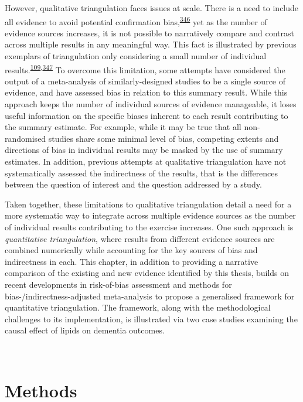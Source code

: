 \documentclass[a4paper, twoside]{templates/ociamthesis}
\begin{document}
However, qualitative triangulation faces issues at scale. There is a need to include all evidence to avoid potential confirmation bias,\textsuperscript{\protect\hyperlink{ref-dubroff2018}{346}} yet as the number of evidence sources increases, it is not possible to narratively compare and contrast across multiple results in any meaningful way. This fact is illustrated by previous exemplars of triangulation only considering a small number of individual results.\textsuperscript{\protect\hyperlink{ref-lawlor2016}{109},\protect\hyperlink{ref-ference2014}{347}} To overcome this limitation, some attempts have considered the output of a meta-analysis of similarly-designed studies to be a single source of evidence, and have assessed bias in relation to this summary result. While this approach keeps the number of individual sources of evidence manageable, it loses useful information on the specific biases inherent to each result contributing to the summary estimate. For example, while it may be true that all non-randomised studies share some minimal level of bias, competing extents and directions of bias in individual results may be masked by the use of summary estimates. In addition, previous attempts at qualitative triangulation have not systematically assessed the indirectness of the results, that is the differences between the question of interest and the question addressed by a study.

Taken together, these limitations to qualitative triangulation detail a need for a more systematic way to integrate across multiple evidence sources as the number of individual results contributing to the exercise increases. One such approach is \emph{quantitative triangulation}, where results from different evidence sources are combined numerically while accounting for the key sources of bias and indirectness in each. This chapter, in addition to providing a narrative comparison of the existing and new evidence identified by this thesis, builds on recent developments in risk-of-bias assessment and methods for bias-/indirectness-adjusted meta-analysis to propose a generalised framework for quantitative triangulation. The framework, along with the methodological challenges to its implementation, is illustrated via two case studies examining the causal effect of lipids on dementia outcomes.

~

\newpage

\hypertarget{methods-3}{%
\section{Methods}\label{methods-3}}
\end{document}
